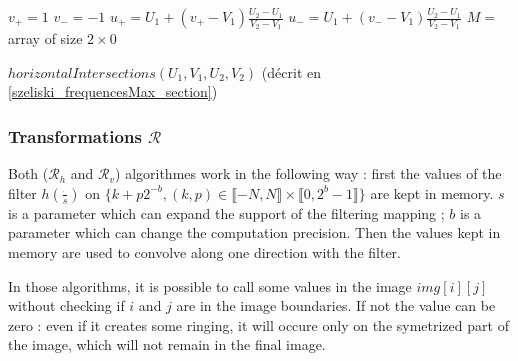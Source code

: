   \begin{algorithme}
   $v_+ = 1$\;
   $v_- = -1$\;
   $u_+ = U_1+(v_+-V_1)\frac{U_2-U_1}{V_2-V_1}$\;
   $u_- = U_1+(v_--V_1)\frac{U_2-U_1}{V_2-V_1}$\;
   $M =$ array of size $2 \times 0$\;
   \caption{$horizontalIntersections(U_1,V_1,U_2,V_2)$ (décrit en \ref{szeliski_frequencesMax_section})}
   \label{szeliski_intersectionsHorizontales}
  \end{algorithme}
  
  \subsubsection{Transformations $\mathcal R$}
  
	Both ($\mathcal{R}_h$ and $\mathcal{R}_v$) algorithmes work in the following way : first the values of the filter $h(\frac{\dot{}}{s})$ on $\{k+p2^{-b},(k,p)\in \llbracket -N,N \rrbracket \times \llbracket 0,2^b-1 \rrbracket\}$ are kept in memory. $s$ is a parameter which can expand the support of the filtering mapping ; $b$ is a parameter which can change the computation precision. Then the values kept in memory are used to convolve along one direction with the filter.


  

In those algorithms, it is possible to call some values in the image $img[i][j]$ without checking if $i$ and $j$ are in the image boundaries. If not the value can be zero : even if it creates some ringing, it will occure only on the symetrized part of the image, which will not remain in the final image.

  
